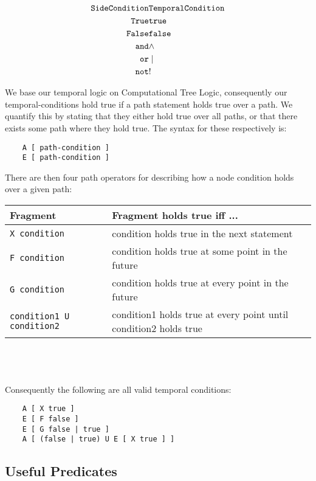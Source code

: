 \documentclass[final,twoside,12pt]{article}
\begin{document}
\begin{eqnarray}
\nonumber {\tt Side Condition} & {\tt Temporal Condition} \\
\nonumber {\tt True} & {\tt true} \\
\nonumber {\tt False} & {\tt false} \\
\nonumber {\tt and} & \wedge \\
\nonumber {\tt or} & \mid \\
\nonumber {\tt not} & {\tt !}
\end{eqnarray}

We base our temporal logic on Computational Tree Logic, consequently our temporal-conditions hold true if a path
statement holds true over a path.  We quantify this by stating that they either hold true over all paths, or
that there exists some path where they hold true.  The syntax for these respectively is:

\begin{lstlisting}
    A [ path-condition ]
    E [ path-condition ]
\end{lstlisting}

There are then four path operators for describing how a node condition holds over a given path:

\begin{tabular}{|l|l|}
\hline
Fragment & Fragment holds true iff ... \\
\hline
{\tt X condition} & condition holds true in the next statement \\
{\tt F condition} & condition holds true at some point in the future \\
{\tt G condition} & condition holds true at every point in the future \\
{\tt condition1 U condition2} & condition1 holds true at every point until condition2 holds true \\
\hline
\end{tabular}
\\
\\
\\
Consequently the following are all valid temporal conditions:
\\
\begin{lstlisting}
    A [ X true ]
    E [ F false ]
    E [ G false | true ]
    A [ (false | true) U E [ X true ] ]
\end{lstlisting}

\subsection{Useful Predicates}
\end{document}
